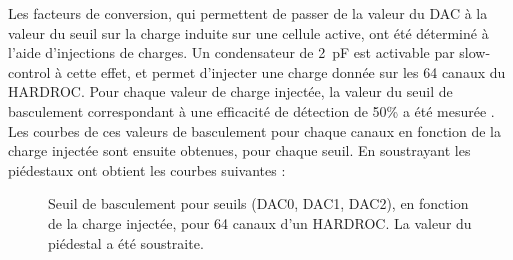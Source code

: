 Les facteurs de conversion, qui permettent de passer de la valeur du DAC à la valeur du seuil sur la charge induite sur une cellule active, ont été déterminé à l'aide d'injections de charges. Un condensateur de \SI{2}{\pico\farad} est activable par slow-control à cette effet, et permet d'injecter une charge donnée sur les \num{64} canaux du HARDROC. Pour chaque valeur de charge injectée, la valeur du seuil de basculement correspondant à une efficacité de détection de 50\% a été mesurée \cite{kieffer:tel-00751999}. Les courbes de ces valeurs de basculement pour chaque canaux en fonction de la charge injectée sont ensuite obtenues, pour chaque seuil. En soustrayant les piédestaux ont obtient les courbes suivantes :

\begin{figure}[ht!]
	\centering
	\hfill
	\hfill
	\caption{Seuil de basculement pour seuils (DAC0, DAC1, DAC2), en fonction de la charge injectée, pour \num{64} canaux d'un HARDROC. La valeur du piédestal a été soustraite.}
	\label{seuils}
\end{figure}

